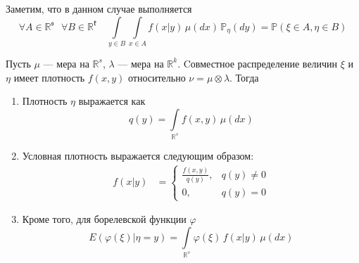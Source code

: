 \documentclass[12pt, russian]{article}
\begin{document}
\noindent Заметим, что в данном случае выполняется
$$ \forall A \in \mathfrak{\mathbb{R}^s} \,\,\,\, \forall B \in \mathfrak{\mathbb{R}^k} \quad
\int\limits_{y\in B}{\int\limits_{x\in A} { f(x|y)\,\mu(dx)\,\mathbb{P}_\eta(dy)} } = \mathbb{P}(\xi\in A, \eta\in B)$$

\begin{theorem}
Пусть $\mu$ --- мера на $\mathbb{R}^s$, $\lambda$ --- мера на $\mathbb{R}^k$.
Cовместное распределение величин $\xi$ и $\eta$ имеет плотность $f(x, y)$ относительно $\nu = \mu \otimes \lambda$.
Тогда
\begin{enumerate}
\item Плотность $\eta$ выражается как
$$ q(y) = \int\limits_{\mathbb{R}^s}{f(x, y)\,\mu(dx)}$$
\item Условная плотность выражается следующим образом:
\begin{equation*}
\begin{split}
f(x|y)
&=\left\{
        \begin{array}{ll}
          \frac{f(x, y)}{q(y)}, & q(y) \not= 0 \\
          0, & q(y) = 0
        \end{array}
      \right.
\end{split}
\end{equation*} 
\item Кроме того, для борелевской функции $\varphi$
$$ E(\varphi(\xi)|\eta = y) = \int\limits_{\mathbb{R}^s}{\varphi(\xi)\,f(x|y)\,\mu(dx)}$$
\end{enumerate}
\end{theorem}
\end{document}
